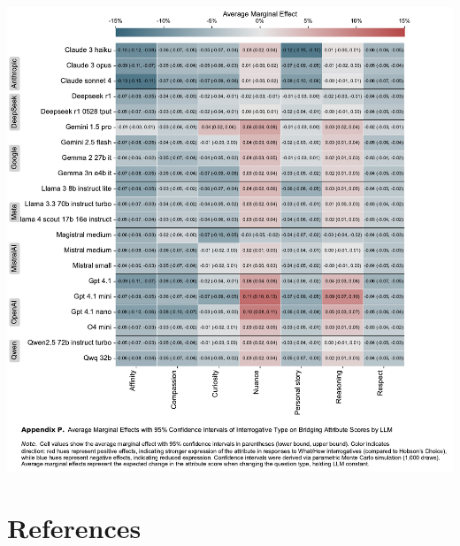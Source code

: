 \documentclass[
  12pt,
]{article}
\begin{document}
\includegraphics{../03_outputs/04_appendices/appendix_p.pdf}

\clearpage

\section*{References}\label{references}
\end{document}
